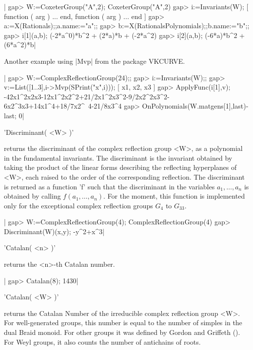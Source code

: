 |    gap> W:=CoxeterGroup("A",2);
    CoxeterGroup("A",2)
    gap> i:=Invariants(W);
    [ function ( arg ) ... end, function ( arg ) ... end ]
    gap> a:=X(Rationals);;a.name:="a";;
    gap> b:=X(RationalsPolynomials);;b.name:="b";;
    gap> i[1](a,b);
    (-2*a^0)*b^2 + (2*a)*b + (-2*a^2)
    gap> i[2](a,b);
    (-6*a)*b^2 + (6*a^2)*b|

Another example using |Mvp| from the package VKCURVE.

|    gap> W:=ComplexReflectionGroup(24);;
    gap> i:=Invariants(W);;
    gap> v:=List([1..3],i->Mvp(SPrint("x",i)));
    [ x1, x2, x3 ]
    gap> ApplyFunc(i[1],v);
    -42x1^2x2x3-12x1^2x2^2+21/2x1^2x3^2-9/2x2^2x3^2-6x2^3x3+14x1^4+18/7x2^\
    4-21/8x3^4
    gap> OnPolynomials(W.matgens[1],last)-last;
    0|

\Section{Discriminant}

'Discriminant( <W> )'

returns  the  discriminant  of  the  complex  reflection  group  <W>,  as a
polynomial in the fundamental invariants. The discriminant is the invariant
obtained  by  taking  the  product  of  the  linear  forms  describing  the
reflecting   hyperplanes  of  <W>,   each  raised  to   the  order  of  the
corresponding reflection. The discriminant is returned as a {\GAP} function
'f'  such  that  the  discriminant  in  the  variables  $a_1,\ldots,a_n$ is
obtained  by calling $f(a_1,\ldots,a_n)$. For  the moment, this function is
implemented  only for  the exceptional  complex reflection  groups $G_4$ to
$G_{33}$.

|    gap> W:=ComplexReflectionGroup(4);
    ComplexReflectionGroup(4)
    gap> Discriminant(W)(x,y);
    -y^2+x^3|

\Section{Catalan}

'Catalan( <n> )'

returns  the <n>-th Catalan number.

|    gap> Catalan(8);
    1430|

'Catalan( <W> )'

returns the Catalan Number of the irreducible complex reflection group <W>.
For well-generated groups, this number is equal to the number of simples in
the  dual  Braid  monoid.  For  other  groups  it was defined by Gordon and
Griffeth  (\cite{gg12}).  For  Weyl  groups,  it  also counts the number of
antichains of roots.


